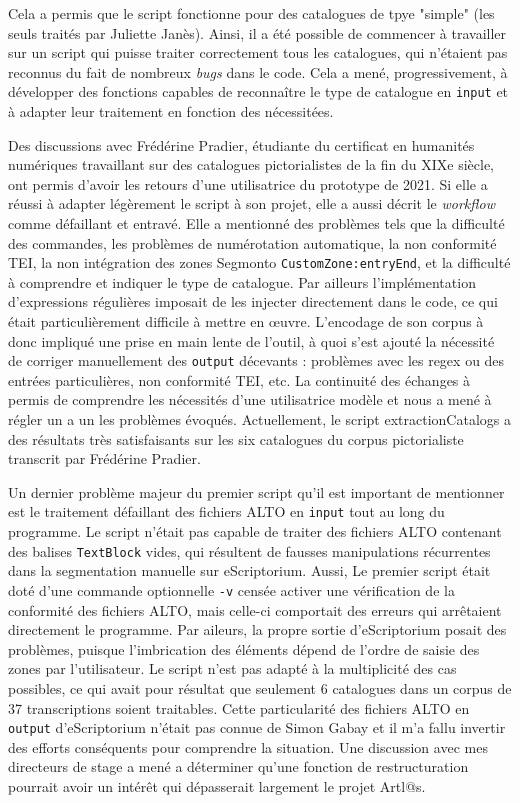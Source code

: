\documentclass[a4paper,12pt,twoside]{book}
\begin{document}
Cela a permis que le script fonctionne pour des catalogues de tpye "simple" (les seuls traités par Juliette Janès). Ainsi, il a été possible de commencer à travailler sur un script qui puisse traiter correctement tous les catalogues, qui n'étaient pas reconnus du fait de nombreux \textit{bugs} dans le code. Cela a mené, progressivement, à développer des fonctions capables de reconnaître le type de catalogue en \texttt{input} et à adapter leur traitement en fonction des nécessitées. 

Des discussions avec Frédérine Pradier, étudiante du certificat en humanités numériques travaillant sur des catalogues pictorialistes de la fin du XIXe siècle, ont permis d'avoir les retours d'une utilisatrice du prototype de 2021. Si elle a réussi à adapter légèrement le script à son projet, elle a aussi décrit le \textit{workflow} comme défaillant et entravé. Elle a mentionné des problèmes tels que la difficulté des commandes, les problèmes de numérotation automatique, la non conformité TEI, la non intégration des zones Segmonto \texttt{CustomZone:entryEnd}, et la difficulté à comprendre et indiquer le type de catalogue. Par ailleurs l'implémentation d'expressions régulières imposait de les injecter directement dans le code, ce qui était particulièrement difficile à mettre en œuvre. L'encodage de son corpus à donc impliqué une prise en main lente de l'outil, à quoi s'est ajouté la nécessité de corriger manuellement des \texttt{output} décevants : problèmes avec les regex ou des entrées particulières, non conformité TEI, etc. La continuité des échanges à permis de comprendre les nécessités d'une utilisatrice modèle et nous a mené à régler un a un les problèmes évoqués. Actuellement, le script extractionCatalogs a des résultats très satisfaisants sur les six catalogues du corpus pictorialiste transcrit par Frédérine Pradier. 

Un dernier problème majeur du premier script qu'il est important de mentionner est le traitement défaillant des fichiers ALTO en \texttt{input} tout au long du programme. Le script n'était pas capable de traiter des fichiers ALTO contenant des balises \texttt{TextBlock} vides, qui résultent de fausses manipulations récurrentes dans la segmentation manuelle sur eScriptorium. Aussi, Le premier script était doté d'une commande optionnelle \texttt{-v} censée activer une vérification de la conformité des fichiers ALTO, mais celle-ci comportait des erreurs qui arrêtaient directement le programme. Par aileurs, la propre sortie d'eScriptorium posait des problèmes, puisque l'imbrication des éléments dépend de l'ordre de saisie des zones par l'utilisateur. Le script n'est pas adapté à la multiplicité des cas possibles, ce qui avait pour résultat que seulement 6 catalogues dans un corpus de 37 transcriptions soient traitables. Cette particularité des fichiers ALTO en \texttt{output} d'eScriptorium n'était pas connue de Simon Gabay et il m'a fallu invertir des efforts conséquents pour comprendre la situation. Une discussion avec mes directeurs de stage a mené a déterminer qu'une fonction de restructuration pourrait avoir un intérêt qui dépasserait largement le projet Artl@s.  
\end{document}
